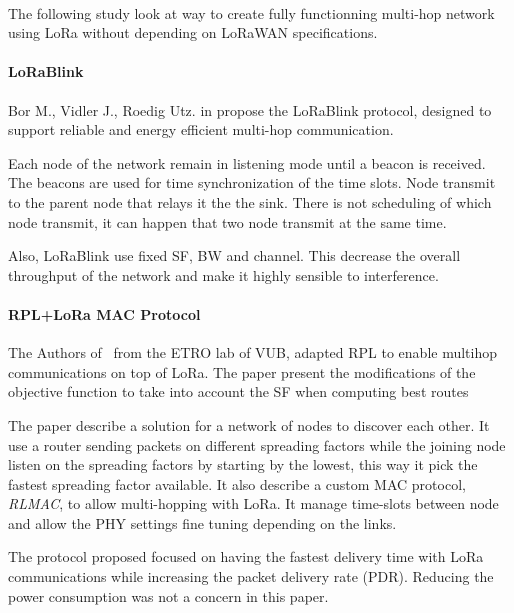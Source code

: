 \paragraph{}

The following study look at way to create fully functionning multi-hop network
using LoRa without depending on LoRaWAN specifications.

\paragraph{LoRaBlink}

Bor M., Vidler J., Roedig Utz. in \cite{lorablink} propose the LoRaBlink
protocol, designed to support reliable and energy efficient multi-hop
communication.

Each node of the network remain in listening mode until a beacon is received.
The beacons are used for time synchronization of the time slots.
Node transmit to the parent node that relays it the the sink.
There is not scheduling of which node transmit, it can happen that two node 
transmit at the same time.


Also, LoRaBlink use fixed SF, BW and channel. This decrease the overall throughput 
of the network and make it highly sensible to interference.

\paragraph{RPL+LoRa MAC Protocol}

The Authors of~\cite{8115756} from the ETRO lab of VUB, adapted RPL to enable
multihop communications on top of LoRa. The paper present the modifications of
the objective function to take into account the SF when computing best routes

The paper describe a solution for a network of nodes to discover each other. It
use a router sending packets on different spreading factors while the joining
node listen on the spreading factors by starting by the lowest, this way it
pick the fastest spreading factor available.
It also describe a custom MAC protocol, \emph{RLMAC}, to allow multi-hopping
with LoRa. It manage time-slots between node and allow the PHY settings fine
tuning depending on the links.

The protocol proposed focused on having the fastest delivery time with LoRa
communications while increasing the packet delivery rate (PDR).
Reducing the power consumption was not a concern in this paper.


